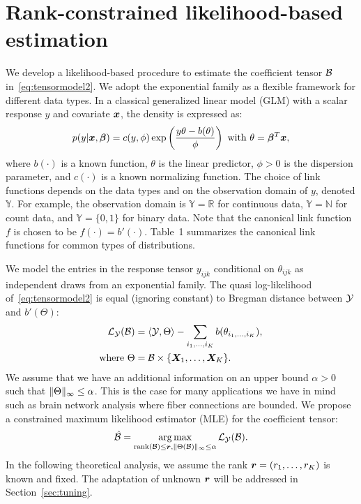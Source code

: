 \documentclass{article}
\theoremstyle{plain}
\theoremstyle{definition}
\begin{document}
\section{Rank-constrained likelihood-based estimation}
We develop a likelihood-based procedure to estimate the coefficient tensor $\mathcal{B}$ in~\eqref{eq:tensormodel2}. We adopt the exponential family as a flexible framework for different data types. In a classical generalized linear model (GLM) with a scalar response $y$ and covariate $\bm x$, the density is expressed as:
\[
p(y|\bm x, \boldsymbol{\beta})=c(y,\phi)\exp\left({y\theta- b(\theta) \over \phi}\right)\ \text{with}\ \theta=\boldsymbol{\beta}^T\bm x,
\]
where $b(\cdot)$ is a known function, $\theta$ is the linear predictor, $\phi>0$ is the dispersion parameter, and $c(\cdot)$ is a known normalizing function. The choice of link functions depends on the data types and on the observation domain of $y$, denoted $\mathbb{Y}$. For example, the observation domain is $\mathbb{Y}=\mathbb{R}$ for continuous data, $\mathbb{Y}=\mathbb{N}$ for count data, and  $\mathbb{Y}=\{0,1\}$ for binary data. 
Note that the canonical link function $f$ is chosen to be $f(\cdot)=b'(\cdot)$. Table~1 summarizes the canonical link functions for common types of distributions. 

We model the entries in the response tensor $y_{ijk}$ conditional on $\theta_{ijk}$ as independent draws from an exponential family. The quasi log-likelihood of~\eqref{eq:tensormodel2} is equal (ignoring constant) to Bregman distance between $\mathcal{Y}$ and $b'(\Theta)$:
\begin{align}
\mathcal{L}_{\mathcal{Y}}(\mathcal{B})&=\langle \mathcal{Y}, \Theta \rangle - \sum_{i_1,\ldots,i_K} b(\theta_{i_1,\ldots,i_K}),\\
\text{where}\ \Theta&=\mathcal{B}\times\{\bm X_1,\ldots,\bm X_K\}.
\end{align}
We assume that we have an additional information on an upper bound $\alpha>0$ such that $\lVert\Theta\rVert_\infty\leq \alpha$. This is the case for many applications we have in mind such as brain network analysis where fiber connections are bounded. We propose a constrained maximum likelihood estimator (MLE) for the coefficient tensor:
\begin{equation}\label{eq:MLE}
\hat {\mathcal{B}}=\operatorname*{arg\,max}_{\text{rank}(\mathcal{B})\leq \bm{r}, \lVert\Theta(\mathcal{B})\rVert_\infty\leq \alpha} \mathcal{L}_{\mathcal{Y}}(\mathcal{B}).
\end{equation}
In the following theoretical analysis, we assume the rank $\bm{r}=(r_1,\ldots,r_K)$ is known and fixed. The adaptation of unknown $\bm{r}$ will be addressed in Section~\ref{sec:tuning}. 
\end{document}
